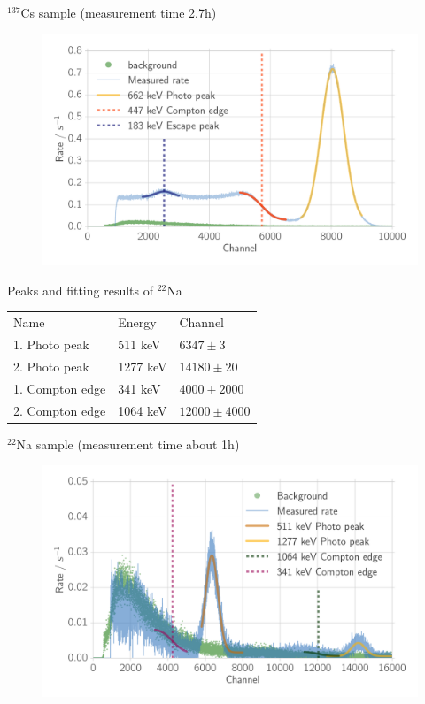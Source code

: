 \documentclass[xcolor=x11names,compress]{beamer}
\renewcommand{\(}{\begin{columns}}
\renewcommand{\)}{\end{columns}}
\newcommand{\<}[1]{\begin{column}{#1}}
\renewcommand{\>}{\end{column}}
\begin{document}
\begin{frame}[t]{$^{137}$Cs sample (measurement time 2.7h)}
 \begin{figure}[htpb]
    \centering
    \includegraphics[width=1.0\linewidth]{../analysis/figures/histo_na_137cs}
    \label{fig:histo_na_137cs}
\end{figure}
\end{frame}

\begin{frame}[t]{Peaks and fitting results of $^{22}$Na}
    \begin{table}[htpb]
    \centering
\label{tab:peaks_na_ps}
\begin{tabular}{lll}
    \rowcolor{LightCyan} Name &Energy & Channel \\ 
       1. Photo peak& 511 keV & $6347 \pm 3$ \\ 
       2. Photo peak& 1277 keV & $14180 \pm 20 $\\
       1. Compton edge& 341 keV& $4000 \pm 2000$\\
       2. Compton edge& 1064 keV & $12000 \pm 4000$
    \end{tabular}
    \end{table}
\end{frame}

\begin{frame}[t]{$^{22}$Na sample (measurement time about 1h) }
    
\begin{figure}[htpb]
    \centering
    \includegraphics[width=1.0\linewidth]{../analysis/figures/histo_na_22na}
\label{fig:histo_na_22na}
\end{figure}

\end{frame}
\end{document}

